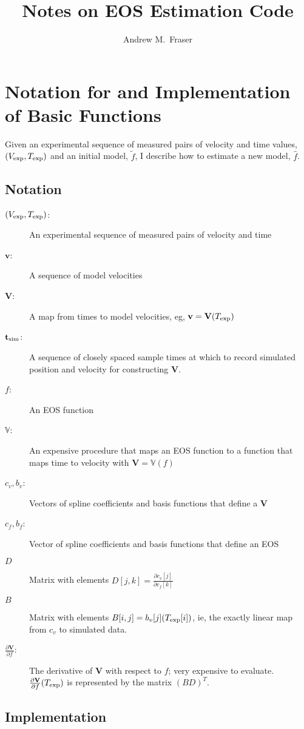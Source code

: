 \documentclass[11pt]{article}
\title{Notes on EOS Estimation Code}
\author{Andrew M.\ Fraser}
\newcommand{\fnom}{\tilde f}
\newcommand{\fhat}{\hat f}
\newcommand{\partiald}[2]{\frac{\partial #1}{\partial #2}}
\newcommand\bv{\mathbf{v}}
\newcommand\Vfunc{\mathbb{V}}
\newcommand\Vt{\mathbf{V}}
\newcommand\vexp{V_{\rm{exp}}}
\newcommand\texp{T_{\rm{exp}}}
\newcommand\cf{c_f}
\newcommand\cv{c_v}
\newcommand\fbasis{b_f}
\newcommand\vbasis{b_v}
\newcommand\tsim{{\mathbf t}_{\rm{sim}}}
\newcommand\DVDf{\partiald{\Vt}{f}}
\begin{document}
\maketitle

\section{Notation for and Implementation of Basic Functions}
\label{sec:basic}

Given an experimental sequence of measured pairs of velocity and time
values, $(\vexp, \texp)$ and an initial model, $\fnom$, I describe how
to estimate a new model, $\fhat$.

\subsection{Notation}
\label{sec:basic_notation}

\begin{description}
\item[$(\vexp, \texp)$:] An experimental sequence of measured pairs of
  velocity and time
\item[$\bv$:] A sequence of model velocities
\item[$\Vt$:] A map from times to model velocities, eg, $\bv =
  \Vt(\texp)$
\item[$\tsim$:] A sequence of closely spaced sample times at which to record
  simulated position and velocity for constructing $\Vt$.
\item[$f$:] An EOS function
\item[$\Vfunc$:] An expensive procedure that maps an EOS function to a
  function that maps time to velocity with $\Vt = \Vfunc(f)$
\item[$\cv,\vbasis$:] Vectors of spline coefficients and basis functions
  that define a $\Vt$
\item[$\cf,\fbasis$:] Vector of spline coefficients and basis functions
  that define an EOS
\item[$D$] Matrix with elements $D[j,k] = \partiald{\cv[j]}{\cf[k]}$
\item[$B$] Matrix with elements $B[i,j] = \vbasis[j](\texp[i])$, ie,
  the exactly linear map from $c_v$ to simulated data.
\item[$\DVDf$:] The derivative of $\Vt$ with respect to $f$; very
  expensive to evaluate.  $\DVDf (\texp)$ is represented by the matrix
  $(BD)^T$.
\end{description}

\subsection{Implementation}
\label{sec:basic_implementation}
\end{document}
